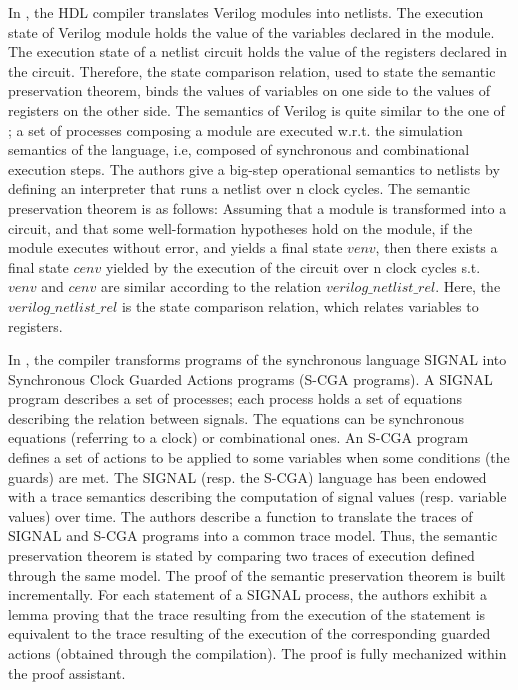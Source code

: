 \documentclass[pdflatex,sn-mathphys]{sn-jnl}%
\theoremstyle{thmstyleone}%
\theoremstyle{thmstyletwo}%
\theoremstyle{thmstylethree}%
\begin{document}

In \cite{Loow2021}, the HDL compiler translates Verilog modules into
netlists. The execution state of Verilog module holds the value of the
variables declared in the module. The execution state of a netlist
circuit holds the value of the registers declared in the
circuit. Therefore, the state comparison relation, used to state the
semantic preservation theorem, binds the values of variables on one
side to the values of registers on the other side. The semantics of
Verilog is quite similar to the one of \vhdl{}; a set of processes
composing a module are executed w.r.t. the simulation semantics of the
language, i.e, composed of synchronous and combinational execution
steps. The authors give a big-step operational semantics to netlists
by defining an interpreter that runs a netlist over n clock cycles.
The semantic preservation theorem is as follows: Assuming that a
module is transformed into a circuit, and that some well-formation
hypotheses hold on the module, if the module executes without error,
and yields a final state $venv$, then there exists a final state
$cenv$ yielded by the execution of the circuit over n clock cycles
s.t. $venv$ and $cenv$ are similar according to the relation
$verilog\_netlist\_rel$. Here, the $verilog\_netlist\_rel$ is the
state comparison relation, which relates variables to registers.

In \cite{Yang2016}, the compiler transforms programs of the
synchronous language SIGNAL into Synchronous Clock Guarded Actions
programs (S-CGA programs). A SIGNAL program describes a set of
processes; each process holds a set of equations describing the
relation between signals. The equations can be synchronous equations
(referring to a clock) or combinational ones. An S-CGA program defines
a set of actions to be applied to some variables when some conditions
(the guards) are met. The SIGNAL (resp. the S-CGA) language has been
endowed with a trace semantics describing the computation of signal
values (resp. variable values) over time. The authors describe a
function to translate the traces of SIGNAL and S-CGA programs into a
common trace model. Thus, the semantic preservation theorem is stated
by comparing two traces of execution defined through the same
model. The proof of the semantic preservation theorem is built
incrementally. For each statement of a SIGNAL process, the authors
exhibit a lemma proving that the trace resulting from the execution of
the statement is equivalent to the trace resulting of the execution of
the corresponding guarded actions (obtained through the
compilation). The proof is fully mechanized within the \coq{} proof
assistant.
\end{document}
